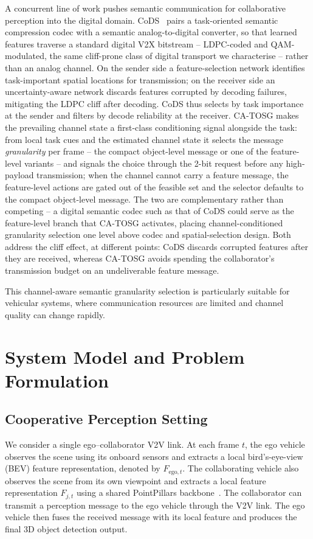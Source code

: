 \documentclass[journal]{IEEEtran}
\newcommand{\method}{CA-TOSG}
\begin{document}
A concurrent line of work pushes semantic communication for collaborative perception into the digital domain. CoDS~\cite{gan2025cods} pairs a task-oriented semantic compression codec with a semantic analog-to-digital converter, so that learned features traverse a standard digital V2X bitstream -- LDPC-coded and QAM-modulated, the same cliff-prone class of digital transport we characterise -- rather than an analog channel. On the sender side a feature-selection network identifies task-important spatial locations for transmission; on the receiver side an uncertainty-aware network discards features corrupted by decoding failures, mitigating the LDPC cliff after decoding. CoDS thus selects by task importance at the sender and filters by decode reliability at the receiver. \method{} makes the prevailing channel state a first-class conditioning signal alongside the task: from local task cues and the estimated channel state it selects the message \emph{granularity} per frame -- the compact object-level message or one of the feature-level variants -- and signals the choice through the 2-bit request before any high-payload transmission; when the channel cannot carry a feature message, the feature-level actions are gated out of the feasible set and the selector defaults to the compact object-level message. The two are complementary rather than competing -- a digital semantic codec such as that of CoDS could serve as the feature-level branch that \method{} activates, placing channel-conditioned granularity selection one level above codec and spatial-selection design. Both address the cliff effect, at different points: CoDS discards corrupted features after they are received, whereas \method{} avoids spending the collaborator's transmission budget on an undeliverable feature message.

This channel-aware semantic granularity selection is particularly suitable for vehicular systems, where communication resources are limited and channel quality can change rapidly.

\section{System Model and Problem Formulation}\label{sec:system}

\subsection{Cooperative Perception Setting}

We consider a single ego--collaborator V2V link. At each frame $t$, the ego vehicle observes the scene using its onboard sensors and extracts a local bird's-eye-view (BEV) feature representation, denoted by $F_{\mathrm{ego},t}$. The collaborating vehicle also observes the scene from its own viewpoint and extracts a local feature representation $F_{j,t}$ using a shared PointPillars backbone~\cite{lang2019pointpillars}. The collaborator can transmit a perception message to the ego vehicle through the V2V link. The ego vehicle then fuses the received message with its local feature and produces the final 3D object detection output.
\end{document}
